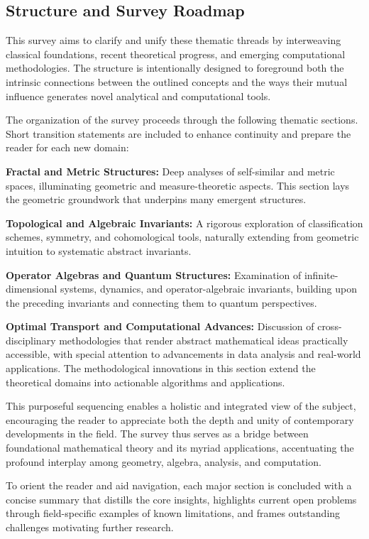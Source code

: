 \documentclass[sigconf]{acmart}
\begin{document}
\subsection{Structure and Survey Roadmap}

This survey aims to clarify and unify these thematic threads by interweaving classical foundations, recent theoretical progress, and emerging computational methodologies. The structure is intentionally designed to foreground both the intrinsic connections between the outlined concepts and the ways their mutual influence generates novel analytical and computational tools.

The organization of the survey proceeds through the following thematic sections. Short transition statements are included to enhance continuity and prepare the reader for each new domain:

\textbf{Fractal and Metric Structures:} Deep analyses of self-similar and metric spaces, illuminating geometric and measure-theoretic aspects. This section lays the geometric groundwork that underpins many emergent structures.

\textbf{Topological and Algebraic Invariants:} A rigorous exploration of classification schemes, symmetry, and cohomological tools, naturally extending from geometric intuition to systematic abstract invariants.

\textbf{Operator Algebras and Quantum Structures:} Examination of infinite-dimensional systems, dynamics, and operator-algebraic invariants, building upon the preceding invariants and connecting them to quantum perspectives.

\textbf{Optimal Transport and Computational Advances:} Discussion of cross-disciplinary methodologies that render abstract mathematical ideas practically accessible, with special attention to advancements in data analysis and real-world applications. The methodological innovations in this section extend the theoretical domains into actionable algorithms and applications.

This purposeful sequencing enables a holistic and integrated view of the subject, encouraging the reader to appreciate both the depth and unity of contemporary developments in the field. The survey thus serves as a bridge between foundational mathematical theory and its myriad applications, accentuating the profound interplay among geometry, algebra, analysis, and computation.

To orient the reader and aid navigation, each major section is concluded with a concise summary that distills the core insights, highlights current open problems through field-specific examples of known limitations, and frames outstanding challenges motivating further research.
\end{document}
